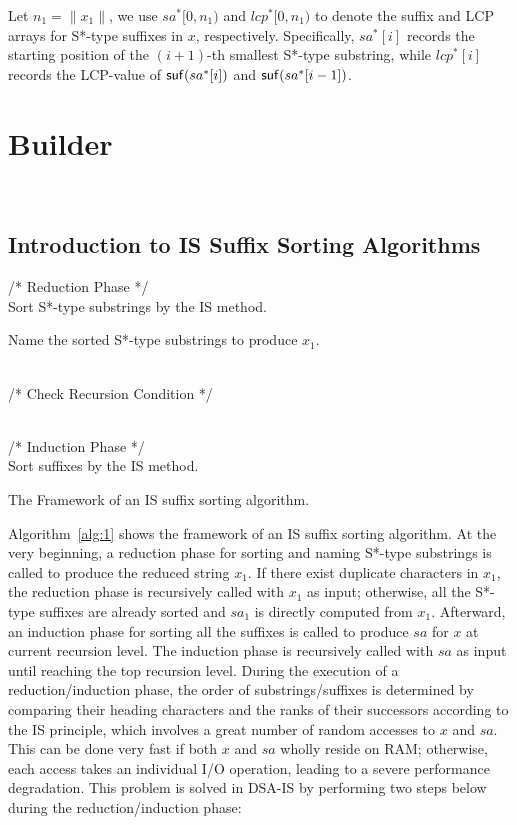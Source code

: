 \documentclass[10pt,journal,compsoc]{IEEEtran}
\begin{document}
Let $n_1 = \|x_1\|$, we use $sa^*[0, n_1)$ and $lcp^*[0, n_1)$ to denote the suffix and LCP arrays for S*-type suffixes in $x$, respectively. Specifically, $sa^*[i]$ records the starting position of the $(i + 1)$-th smallest S*-type substring, while $lcp^*[i]$ records the LCP-value of ${\sf suf}(sa^*[i])$ and ${\sf suf}(sa^*[i - 1])$.


\section{Builder}~\label{sec:builder}

\subsection{Introduction to IS Suffix Sorting Algorithms} \label{subsec:improvement}

\begin{algorithm}
	\SetAlgoNoLine
	
	/* Reduction Phase */ \\
	Sort S*-type substrings by the IS method.
	
	Name the sorted S*-type substrings to produce $x_1$.
	
	~\\
	
	/* Check Recursion Condition */ \\	
	
	~\\
	
	/* Induction Phase */ \\
	Sort suffixes by the IS method.
	
	
	\caption{The Framework of an IS suffix sorting algorithm.}
	
	\label{alg:1}
\end{algorithm}

Algorithm~\ref{alg:1} shows the framework of an IS suffix sorting algorithm. At the very beginning, a reduction phase for sorting and naming S*-type substrings is called to produce the reduced string $x_1$. If there exist duplicate characters in $x_1$, the reduction phase is recursively called with $x_1$ as input; otherwise, all the S*-type suffixes are already sorted and $sa_1$ is directly computed from $x_1$.
Afterward, an induction phase for sorting all the suffixes is called to produce $sa$ for $x$ at current recursion level. The induction phase is recursively called with $sa$ as input until reaching the top recursion level. During the execution of a reduction/induction phase, the order of substrings/suffixes is determined by comparing their heading characters and the ranks of their successors according to the IS principle, which involves a great number of random accesses to $x$ and $sa$. This can be done very fast if both $x$ and $sa$ wholly reside on RAM; otherwise, each access takes an individual I/O operation, leading to a severe performance degradation. This problem is solved in DSA-IS by performing two steps below during the reduction/induction phase:
\end{document}
